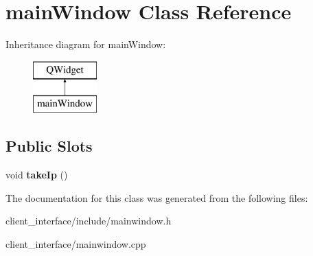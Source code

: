 \hypertarget{classmain_window}{}\section{main\+Window Class Reference}
\label{classmain_window}
Inheritance diagram for main\+Window\+:\begin{figure}[H]
\begin{center}
\leavevmode
\includegraphics[height=2.000000cm]{classmain_window}
\end{center}
\end{figure}
\subsection*{Public Slots}
\begin{DoxyCompactItemize}
\item 
\mbox{\label{classmain_window_ae38f3474108e081d12b5c2bafd09714b}} 
void {\bfseries take\+Ip} ()
\end{DoxyCompactItemize}


The documentation for this class was generated from the following files\+:\begin{DoxyCompactItemize}
\item 
client\+\_\+interface/include/mainwindow.\+h\item 
client\+\_\+interface/mainwindow.\+cpp\end{DoxyCompactItemize}
